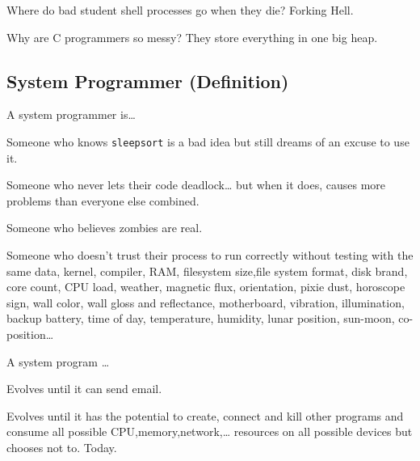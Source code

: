 Where do bad student shell processes go when they die? Forking Hell.

Why are C programmers so messy? They store everything in one big heap.

\subsection{System Programmer (Definition)}

A system programmer is\ldots{}

Someone who knows \texttt{sleepsort} is a bad idea but still dreams of an excuse to use it.

Someone who never lets their code deadlock\ldots{} but when it does, causes more problems than everyone else combined.

Someone who believes zombies are real.

Someone who doesn't trust their process to run correctly without testing with the same data, kernel, compiler, RAM, filesystem size,file system format, disk brand, core count, CPU load, weather, magnetic flux, orientation, pixie dust, horoscope sign, wall color, wall gloss and reflectance, motherboard, vibration, illumination, backup battery, time of day, temperature, humidity, lunar position, sun-moon, co-position\ldots{}

A system program \ldots{}

Evolves until it can send email.

Evolves until it has the potential to create, connect and kill other programs and consume all possible CPU,memory,network,\ldots{} resources on all possible devices but chooses not to. Today.
